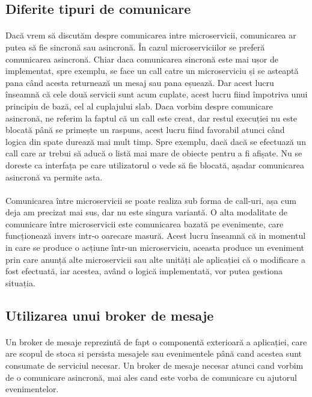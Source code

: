\documentclass[12pt]{report}
\begin{document}
		\subsection{Diferite tipuri de comunicare}
	\paragraph{}Dacă vrem să discutăm despre comunicarea intre microservicii, comunicarea ar putea să fie sincronă sau asincronă. În cazul microserviciilor se preferă comunicarea asincronă. Chiar daca comunicarea sincronă este mai ușor de implementat, spre exemplu, se face un call catre un microserviciu și se asteaptă pana când acesta returnează un mesaj sau pana eșuează. Dar acest lucru înseamnă că cele două servicii sunt acum cuplate, acest lucru fiind împotriva unui principiu de bază, cel al cuplajului slab. Daca vorbim despre comunicare asincronă, ne referim la faptul că un call este creat, dar restul execuției nu este blocată până se primește un raspuns, acest lucru fiind favorabil atunci când logica din spate durează mai mult timp. Spre exemplu, dacă dacă se efectuază un call care ar trebui să aducă o listă mai mare de obiecte pentru a fi afișate. Nu se doreste ca interfața pe care utilizatorul o vede să fie blocată, așadar comunicarea asincronă va permite asta.
	\paragraph{}Comunicarea între microservicii se poate realiza sub forma de call-uri, așa cum deja am precizat mai sus, dar nu este singura variantă. O alta modalitate de comunicare între microservicii este comunicarea bazată pe evenimente, care funcționează invers intr-o oarecare masură. Acest lucru înseamnă că in momentul in care se produce o acțiune într-un microserviciu, aceasta produce un eveniment prin care anunță alte microservicii sau alte unități ale aplicației că o modificare a fost efectuată, iar acestea, având o logică implementată, vor putea gestiona situația.
		\subsection{Utilizarea unui broker de mesaje}
	\paragraph{}Un broker de mesaje reprezintă de fapt o componentă exterioară a aplicației, care are scopul de stoca si persista mesajele sau evenimentele până cand acestea sunt consumate de serviciul necesar. Un broker de mesaje necesar atunci cand vorbim de o comunicare asincronă, mai ales cand este vorba de comunicare cu ajutorul evenimentelor.
\end{document}
